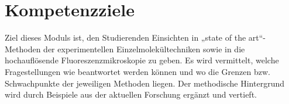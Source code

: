 \section{Kompetenzziele}
Ziel dieses Moduls ist, den Studierenden Einsichten in „state of the art“-Methoden der experimentellen Einzelmolekültechniken sowie in die hochauflösende Fluoreszenzmikroskopie zu geben. Es wird vermittelt, welche Fragestellungen wie beantwortet werden können und wo die Grenzen bzw. Schwachpunkte der jeweiligen Methoden liegen. Der methodische Hintergrund wird durch Beispiele aus der aktuellen Forschung ergänzt und vertieft.